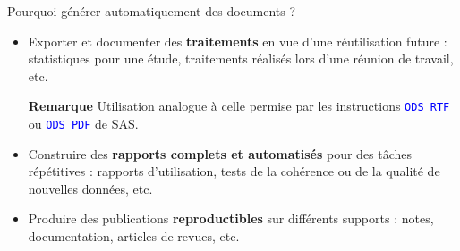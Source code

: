 \documentclass[12pt,handout,ignorenonframetext,]{beamer}
\providecommand{\tightlist}{%
\setlength{\itemsep}{0pt}\setlength{\parskip}{0pt}}
\begin{document}
\begin{frame}{\large Pourquoi générer automatiquement des documents ?}

\begin{itemize}
\item
  Exporter et documenter des \textbf{traitements} en vue d'une
  réutilisation future : statistiques pour une étude, traitements
  réalisés lors d'une réunion de travail, etc.

  \vspace{0.2cm}

  \small  \textbf{Remarque} Utilisation analogue à celle permise par les
  instructions \textcolor{blue}{\texttt{ODS RTF}} ou
  \textcolor{blue}{\texttt{ODS PDF}} de SAS.
\end{itemize}

\pause \normalsize 

\begin{itemize}
\tightlist
\item
  Construire des \textbf{rapports complets et automatisés} pour des
  tâches répétitives : rapports d'utilisation, tests de la cohérence ou
  de la qualité de nouvelles données, etc.
\end{itemize}

\pause \vspace{0.2cm}

\begin{itemize}
\tightlist
\item
  Produire des publications \textbf{reproductibles} sur différents
  supports : notes, documentation, articles de revues, etc.
\end{itemize}

\end{frame}
\end{document}
